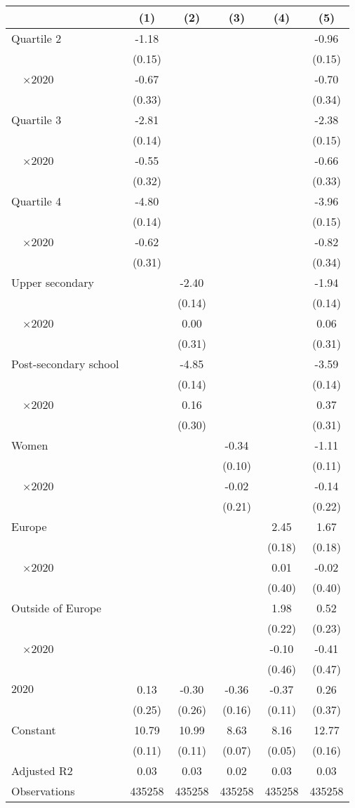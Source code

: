 
\begin{tabular}{@{}l*{5}{S[table-format={-}2.2{\tnote{***}}]}@{}}
\toprule
{} & {(1)} & {(2)} & {(3)} & {(4)} & {(5)}\tabularnewline%
\midrule
Quartile 2 & -1.18\tnote{***} &  &  &  & -0.96\tnote{***}\tabularnewline%
 & (0.15) &  &  &  & (0.15)\tabularnewline%
~~\(\times 2020\) & -0.67\tnote{*} &  &  &  & -0.70\tnote{*}\tabularnewline%
 & (0.33) &  &  &  & (0.34)\tabularnewline%
Quartile 3 & -2.81\tnote{***} &  &  &  & -2.38\tnote{***}\tabularnewline%
 & (0.14) &  &  &  & \vphantom{1} (0.15)\tabularnewline%
~~\(\times 2020\) & -0.55\tnote{\dagger} &  &  &  & -0.66\tnote{*}\tabularnewline%
 & (0.32) &  &  &  & (0.33)\tabularnewline%
Quartile 4 & -4.80\tnote{***} &  &  &  & -3.96\tnote{***}\tabularnewline%
 & (0.14) &  &  &  & (0.15)\tabularnewline%
~~\(\times 2020\) & -0.62\tnote{*} &  &  &  & -0.82\tnote{*}\tabularnewline%
 & (0.31) &  &  &  & (0.34)\tabularnewline%
Upper secondary &  & -2.40\tnote{***} &  &  & -1.94\tnote{***}\tabularnewline%
 &  & (0.14) &  &  & \vphantom{1} (0.14)\tabularnewline%
~~\(\times 2020\) &  & 0.00 &  &  & 0.06\tabularnewline%
 &  & (0.31) &  &  & (0.31)\tabularnewline%
Post-secondary school &  & -4.85\tnote{***} &  &  & -3.59\tnote{***}\tabularnewline%
 &  & (0.14) &  &  & (0.14)\tabularnewline%
~~\(\times 2020\) &  & 0.16 &  &  & 0.37\tabularnewline%
 &  & (0.30) &  &  & (0.31)\tabularnewline%
Women &  &  & -0.34\tnote{***} &  & -1.11\tnote{***}\tabularnewline%
 &  &  & (0.10) &  & (0.11)\tabularnewline%
~~\(\times 2020\) &  &  & -0.02 &  & -0.14\tabularnewline%
 &  &  & (0.21) &  & (0.22)\tabularnewline%
Europe &  &  &  & 2.45\tnote{***} & 1.67\tnote{***}\tabularnewline%
 &  &  &  & (0.18) & (0.18)\tabularnewline%
~~\(\times 2020\) &  &  &  & 0.01 & -0.02\tabularnewline%
 &  &  &  & (0.40) & (0.40)\tabularnewline%
Outside of Europe &  &  &  & 1.98\tnote{***} & 0.52\tnote{*}\tabularnewline%
 &  &  &  & (0.22) & (0.23)\tabularnewline%
~~\(\times 2020\) &  &  &  & -0.10 & -0.41\tabularnewline%
 &  &  &  & (0.46) & (0.47)\tabularnewline%
\midrule
\(2020\) & 0.13 & -0.30 & -0.36\tnote{*} & -0.37\tnote{***} & 0.26\tabularnewline%
 & (0.25) & (0.26) & (0.16) & (0.11) & (0.37)\tabularnewline%
Constant & 10.79\tnote{***} & 10.99\tnote{***} & 8.63\tnote{***} & 8.16\tnote{***} & 12.77\tnote{***}\tabularnewline%
 & (0.11) & (0.11) & (0.07) & (0.05) & (0.16)\tabularnewline%
\midrule
Adjusted R2 & 0.03 & 0.03 & 0.02 & 0.03 & 0.03\tabularnewline%
Observations & {\num{435258}} & {\num{435258}} & {\num{435258}} & {\num{435258}} & {\num{435258}}\tabularnewline%
\bottomrule
\end{tabular}
